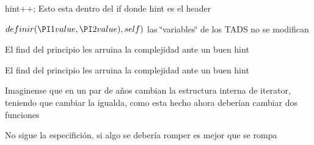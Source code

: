 \begin{DoxyRefList}
hint++; Esto esta dentro del if donde hint es el header  
\item[\label{bug__bug000013}%
\hypertarget{bug__bug000013}{}%
Miembro \hyperlink{classaed2_1_1map_a2ef6723c183916276b0afc4a4c721475_a2ef6723c183916276b0afc4a4c721475}{aed2\+:\+:map$<$ Key, Meaning, Compare $>$\+:\+:insert\+\_\+or\+\_\+assign} (\hyperlink{classaed2_1_1map_1_1const__iterator}{const\+\_\+iterator} hint, const value\+\_\+type \&value)]$ definir(\PI1 value, \PI2 value), self) $ las \char`\"{}variables\char`\"{} de los T\+A\+DS no se modifican

El find del principio les arruina la complejidad ante un buen hint

El find del principio les arruina la complejidad ante un buen hint 
\item[\label{bug__bug000025}%
\hypertarget{bug__bug000025}{}%
Miembro \hyperlink{classaed2_1_1map_1_1iterator_a836c7a166d63f507c4f79085ae953c51_a836c7a166d63f507c4f79085ae953c51}{aed2\+:\+:map$<$ Key, Meaning, Compare $>$\+:\+:iterator\+:\+:operator!=} (iterator other) const ]Imaginense que en un par de años cambian la estructura interna de iterator, teniendo que cambiar la igualda, como esta hecho ahora deberían cambiar dos funciones 
\item[\label{bug__bug000023}%
\hypertarget{bug__bug000023}{}%
Miembro \hyperlink{classaed2_1_1map_1_1iterator_a7c44de7f0508186e135ddbcfe782fec5_a7c44de7f0508186e135ddbcfe782fec5}{aed2\+:\+:map$<$ Key, Meaning, Compare $>$\+:\+:iterator\+:\+:operator++} ()]No sigue la especifición, si algo se debería romper es mejor que se rompa 


\end{DoxyRefList}
